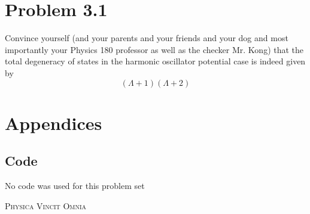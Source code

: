 \documentclass[12pt,a4paper]{article}
\begin{document}
	
	\section*{
		Problem 3.1
	}
	\begin{problem}
		Convince yourself (and your parents and your friends and your dog
		and most importantly your Physics 180 professor as well as the checker
		Mr. Kong) that the total degeneracy of states in the harmonic oscillator
		potential case is indeed given by
		\begin{equation}
			(\Lambda + 1)(\Lambda + 2)
		\end{equation}
	\end{problem}
	\begin{solution_pset}

	\end{solution_pset}
	\newpage

	 
	 
	\section*{Appendices}
		\label{appendix}
		\subsection*{Code} 
		No code was used for this problem set
	\vfill
	\begin{center}
		\textsc{Physica Vincit Omnia}
	\end{center}
\end{document}
